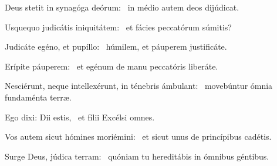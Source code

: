 \item Deus stetit in synagóga deórum:~\psstar{} in médio autem deos dijúdicat.

\item Usquequo judicátis iniquitátem:~\psstar{} et fácies peccatórum súmitis?

\item Judicáte egéno, et pupíllo:~\psstar{} húmilem, et páuperem justificáte.

\item Erípite páuperem:~\psstar{} et egénum de manu peccatóris liberáte.

\item Nesciérunt, neque intellexérunt, in ténebris ámbulant:~\psstar{} movebúntur ómnia fundaménta terræ.

\item Ego dixi: Dii estis,~\psstar{} et fílii Excélsi omnes.

\item Vos autem sicut hómines moriémini:~\psstar{} et sicut unus de princípibus cadétis.

\item Surge Deus, júdica terram:~\psstar{} quóniam tu hereditábis in ómnibus géntibus.